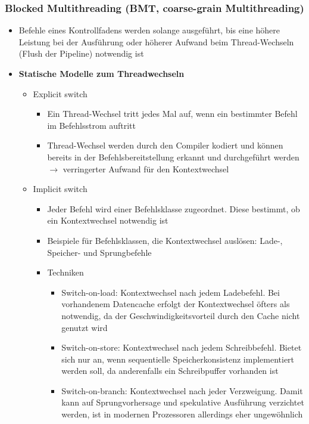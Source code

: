 \subsubsection{Blocked Multithreading (BMT, coarse-grain Multithreading)}
\begin{itemize}
	\item Befehle eines Kontrollfadens werden solange ausgeführt, bis eine höhere Leistung bei der Ausführung oder höherer Aufwand beim Thread-Wechseln (Flush der Pipeline) notwendig ist
	\item \textbf{Statische Modelle zum Threadwechseln}
	\begin{itemize}
		\item Explicit switch
		\begin{itemize}
			\item Ein Thread-Wechsel tritt jedes Mal auf, wenn ein bestimmter Befehl im Befehlsstrom auftritt
			\item Thread-Wechsel werden durch den Compiler kodiert und können bereits in der Befehlsbereitstellung erkannt und durchgeführt werden \(\rightarrow\) verringerter Aufwand für den Kontextwechsel
		\end{itemize}
		\item Implicit switch
		\begin{itemize}
			\item Jeder Befehl wird einer Befehlsklasse zugeordnet. Diese bestimmt, ob ein Kontextwechsel notwendig ist
			\item Beispiele für Befehlsklassen, die Kontextwechsel auslösen: Lade-, Speicher- und Sprungbefehle
			\item Techniken
			\begin{itemize}
				\item Switch-on-load: Kontextwechsel nach jedem Ladebefehl. Bei vorhandenem Datencache erfolgt der Kontextwechsel öfters als notwendig, da der Geschwindigkeitsvorteil durch den Cache nicht genutzt wird
				\item Switch-on-store: Kontextwechsel nach jedem Schreibbefehl. Bietet sich nur an, wenn sequentielle Speicherkonsistenz implementiert werden soll, da anderenfalls ein Schreibpuffer vorhanden ist
				\item Switch-on-branch: Kontextwechsel nach jeder Verzweigung. Damit kann auf Sprungvorhersage und spekulative Ausführung verzichtet werden, ist in modernen Prozessoren allerdings eher ungewöhnlich
			\end{itemize}
		\end{itemize}
	\end{itemize}

\end{itemize}
